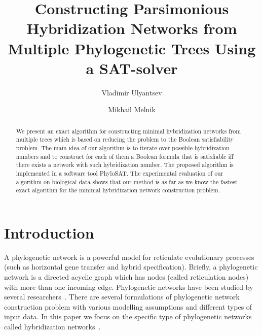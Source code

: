 \documentclass[runningheads, envcountsame, a4paper]{llncs}
\begin{document}
\mainmatter           
\title{Constructing Parsimonious Hybridization Networks from Multiple Phylogenetic Trees Using a SAT-solver}
\titlerunning{ } 
\toctitle{ }

\author{Vladimir Ulyantsev \and Mikhail Melnik}

\maketitle
\setcounter{footnote}{0}

\begin{abstract}
  We present an exact algorithm for constructing minimal hybridization networks from multiple trees 
  which is based on reducing 
  the problem to the Boolean satisfiability problem. The main idea of our algorithm is to iterate over
  possible hybridization numbers and to construct for each of them a Boolean formula that is satisfiable iff there
  exists a network with such hybridization number. The proposed algorithm is implemented in a software tool PhyloSAT.
  The experimental evaluation of our algorithm on biological data shows that our method is as far as we know the 
  fastest exact algorithm for the minimal hybridization network construction problem.

\end{abstract}

\section{Introduction}

A phylogenetic network is a powerful model for reticulate
evolutionary processes (such as horizontal gene transfer and hybrid specification).
Briefly, a phylogenetic network is a directed acyclic graph which has
nodes (called reticulation nodes) with more than one incoming edge. Phylogenetic
networks have been studied by several researchers~\cite{huson2010phylogenetic, morrison2011introduction, 
nakhleh2011evolutionary}. There are several formulations of phylogenetic network
construction problem with various modelling assumptions and different types of input data. 
In this paper we focus on the specific type of phylogenetic networks called hybridization
networks~\cite{semple2006hybridization, chen2010hybridnet}.
\end{document}
